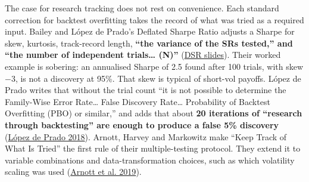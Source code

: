 \documentclass{article}
\begin{document}
The case for research tracking does not rest on convenience. Each standard correction for backtest overfitting takes the record of what was tried as a required input. Bailey and López de Prado's Deflated Sharpe Ratio adjusts a Sharpe for skew, kurtosis, track-record length, \textbf{``the variance of the SRs tested,'' and ``the number of independent trials\ldots{} (N)''} (\href{https://pdfs.semanticscholar.org/c215/d0a2064ce1a3565d276475abc84305418f0f.pdf}{DSR slides}). Their worked example is sobering: an annualised Sharpe of 2.5 found after 100 trials, with skew \ensuremath{-}3, is not a discovery at 95\%. That skew is typical of short-vol payoffs. López de Prado writes that without the trial count ``it is not possible to determine the Family-Wise Error Rate\ldots{} False Discovery Rate\ldots{} Probability of Backtest Overfitting (PBO) or similar,'' and adds that about \textbf{20 iterations of ``research through backtesting'' are enough to produce a false 5\% discovery} (\href{https://www.smallake.kr/wp-content/uploads/2018/07/SSRN-id3104816.pdf}{López de Prado 2018}). Arnott, Harvey and Markowitz make ``Keep Track of What Is Tried'' the first rule of their multiple-testing protocol. They extend it to variable combinations and data-transformation choices, such as which volatility scaling was used (\href{https://people.duke.edu/~charvey/Research/Published_Papers/P138_A_backtesting_protocol.pdf}{Arnott et al. 2019}).
\end{document}
